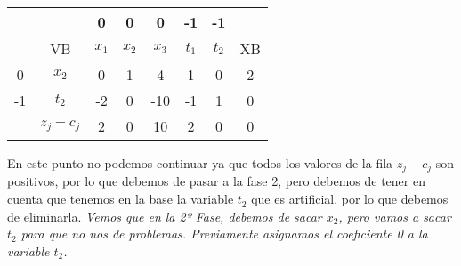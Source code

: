 \begin{itemize}
    \begin{table}[H]
        \centering
        \begin{tabular}{|c|c|c|c|c|c|c|c|}
        \hline
        &  & 0 & 0 & 0 & -1 & -1 &\\
        \hline
        & VB & $x_1$ & $x_2$ & $x_3$ & $t_1$ & $t_2$ & XB \\
        \hline
        0 & $x_2$ & 0 & 1 & 4 & 1 & 0 & 2\\
        \hline
        -1 & $t_2$ & -2 & 0 & -10 & -1& 1 &0\\
        \hline
        & $z_j - c_j$ & 2 & 0& 10 & 2 & 0 &0\\
        \hline
        \end{tabular}
    \end{table}




    En este punto no podemos continuar ya que todos los valores de la fila $z_j - c_j$ son positivos, por lo que debemos de pasar a la fase 2, pero debemos de tener en cuenta que tenemos en la base la variable $t_2$ que es artificial, por lo que debemos de eliminarla. \textit{Vemos que en la 2º Fase, debemos de sacar $x_2$, pero vamos a sacar $t_2$ para que no nos de problemas. Previamente asignamos el coeficiente 0 a la variable $t_2$.}


\end{itemize}
